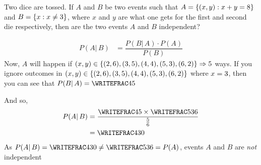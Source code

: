 


\question[4] Two dice are tossed. If $A$ and $B$ be two events such that
$A = \lbrace(x,y) : x + y = 8\rbrace$ and $B = \lbrace x : x\neq3\rbrace$, 
where $x$ and $y$ are what one gets for the first and second die respectively, 
then are the two events $A$ and $B$ independent?


\watchout

\ifprintanswers
\fi 

\begin{solution}[\halfpage]
	\begin{align}
  		P(A\vert\,B) &= \dfrac{P(B\vert\,A)\cdot P(A)}{P(B)}
  	\end{align}
  	Now, $A$ will happen if $(x,y) \in\lbrace(2,6),(3,5),(4,4),(5,3),(6,2)\rbrace \Rightarrow5$ ways.
  	If you ignore outcomes in $(x,y)\in\lbrace(2,6),(3,5),(4,4),(5,3),(6,2)\rbrace$ where $x=3$, then you can see 
  	that $P(B\vert\,A) = \WRITEFRAC\vbfive\vbfour$
  	
  	And so, \begin{align}
  		P(A\vert\, B) &= \dfrac{\WRITEFRAC\vbfive\vbfour\times\WRITEFRAC\vbfour{36}}{\frac{5}{6}} \\
  		&= \WRITEFRAC\vbfive{30}
  	\end{align}
  	As $P(A\vert\,B) = \WRITEFRAC\vbfive{30}\neq \WRITEFRAC\vbfour{36} = P(A)$, 
  	events $A$ and $B$ are \textit{not} independent
\end{solution}


